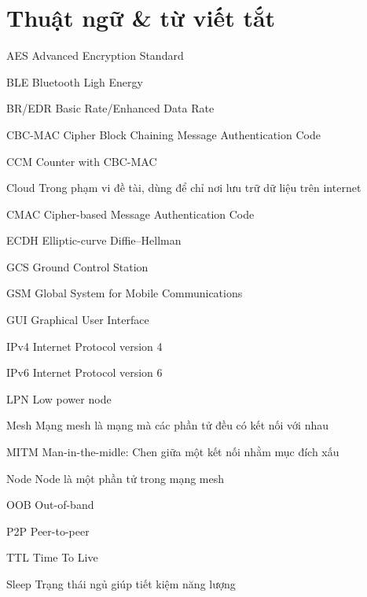\newcommand{\abbrlabel}[1]{\makebox[3cm][l]{\textbf{#1}\ \dotfill}}
\newenvironment{abbreviations}{\begin{list}{}{\renewcommand{\makelabel}{\abbrlabel}}}{\end{list}}

\chapter*{Thuật ngữ \& từ viết tắt}
\thispagestyle{empty}
\pagestyle{empty}
\vspace{1.0cm}
\begin{abbreviations}
	\item[AES] Advanced Encryption Standard 
	\item[BLE] Bluetooth Ligh Energy
	\item[BR/EDR] Basic Rate/Enhanced Data Rate 
	\item[CBC-MAC] Cipher Block Chaining Message Authentication Code
	\item[CCM] Counter with CBC-MAC
	\item[Cloud] Trong phạm vi đề tài, dùng để chỉ nơi lưu trữ dữ liệu trên internet
	\item[CMAC] Cipher-based Message Authentication Code
	\item[ECDH] Elliptic-curve Diffie–Hellman
	\item[GCS] Ground Control Station
	\item[GSM] Global System for Mobile Communications
	\item[GUI] Graphical User Interface
	\item[IPv4] Internet Protocol version 4
	\item[IPv6] Internet Protocol version 6
	\item[LPN]  Low power node
	\item[Mesh] Mạng mesh là mạng mà các phần tử đều có kết nối với nhau
	\item[MITM] Man-in-the-midle: Chen giữa một kết nối nhằm mục đích xấu
	\item[Node] Node là một phần tử trong mạng mesh
	\item[OOB] Out-of-band
	\item[P2P] Peer-to-peer
	\item[TTL] Time To Live
	\item[Sleep] Trạng thái ngủ giúp tiết kiệm năng lượng
\end{abbreviations}